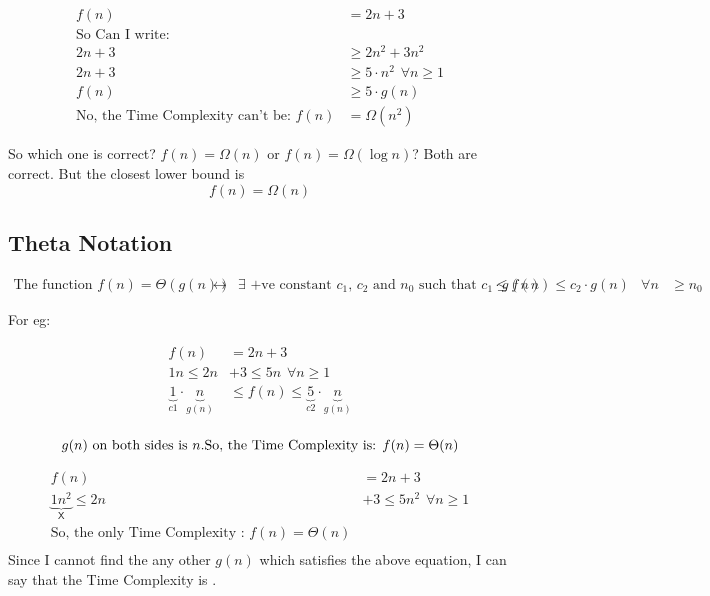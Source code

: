 \documentclass[]{article}
\begin{document}
\[
\begin{aligned}
    f(n) &= 2n + 3 \\
    \text{So Can I write: }\\
        2n+3 &\geq 2n^2 + 3n^2\\ 
        2n+3 &\geq 5\cdot n^2 \hspace{5pt} \forall n \geq 1 \\
        f(n) &\geq 5 \cdot g(n) \\
        \text{No, the Time Complexity can't be: } f(n) &= \Omega(n^2)
\end{aligned}
\]

So which one is correct? $f(n) = \Omega(n)$ or $f(n) = \Omega(\log{n})$? Both are correct. But the closest lower bound is 
\[
\boxed{f(n) = \Omega(n)}
\]

\subsection{Theta Notation}
\[
\begin{aligned}
        \text{The function } f(n) = \Theta{(g(n))} &\leftrightarrow &\exists \text{ +ve constant $c_1$, $c_2$ and } 
        n_0 \text{ such that } c_1 \cdot g{(n)} &\leq f{(n)} \leq c_2 \cdot g{(n)} &\forall n &\geq n_0
\end{aligned}
\]

For eg:

\[
\begin{aligned}
        f(n) &= 2n + 3 \\
        1n \leq 2n &+ 3 \leq 5n  \hspace{5pt} \forall  n \geq 1 \\
        \underbrace{1}_{c1} \cdot \underbrace{n}_{g(n)} &\leq f(n) \leq \underbrace{5}_{c2} \cdot \underbrace{n}_{g(n)}\\    
\end{aligned}
\]

\[
g(n)\text{ on both sides is }n. \\
\text{So, the Time Complexity is: } \\
f(n) = \Theta(n)\\
\]


\[
\begin{aligned}
        f(n) &= 2n + 3 \\
    \underbrace{1n^2}_{\mathsf{X}}  \leq 2n &+ 3 \leq 5n^2  \hspace{5pt} \forall  n \geq 1 \\
        \text{So, the only Time Complexity : } \boxed{f(n) = \Theta(n)}\\
\end{aligned}
\]
Since I cannot find the any other $g(n)$ which satisfies the above equation, I can say that the Time Complexity is .
\end{document}
